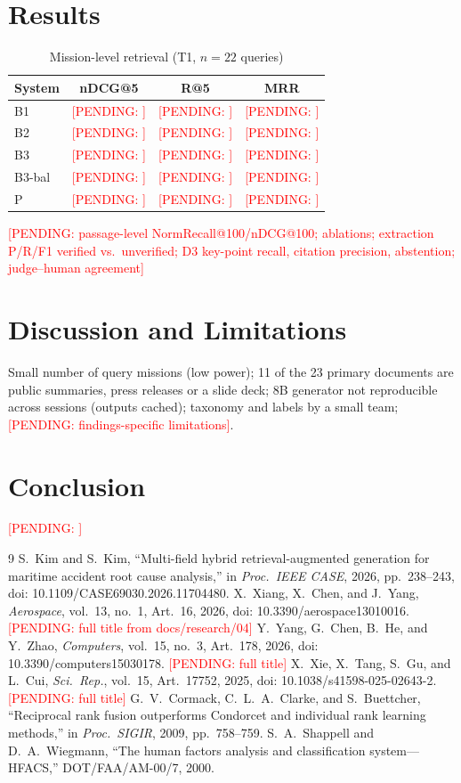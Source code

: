 \documentclass[conference]{IEEEtran}
\newcommand{\PENDING}[1]{\textcolor{red}{[PENDING: #1]}}
\begin{document}
\section{Results}
\begin{table}[t]\centering\caption{Mission-level retrieval (T1, $n=22$ queries)}
\begin{tabular}{lccc}\toprule System & nDCG@5 & R@5 & MRR\\\midrule
B1 & \PENDING{} & \PENDING{} & \PENDING{}\\
B2 & \PENDING{} & \PENDING{} & \PENDING{}\\
B3 & \PENDING{} & \PENDING{} & \PENDING{}\\
B3-bal & \PENDING{} & \PENDING{} & \PENDING{}\\
P & \PENDING{} & \PENDING{} & \PENDING{}\\\bottomrule\end{tabular}\end{table}
\PENDING{passage-level NormRecall@100/nDCG@100; ablations; extraction P/R/F1 verified vs.\ unverified;
D3 key-point recall, citation precision, abstention; judge--human agreement}

\section{Discussion and Limitations}
Small number of query missions (low power); 11 of the 23 primary documents are public summaries, press releases or a slide deck; 8B
generator not reproducible across sessions (outputs cached); taxonomy and labels by a small team;
\PENDING{findings-specific limitations}.

\section{Conclusion}
\PENDING{}

\begin{thebibliography}{9}
 S.~Kim and S.~Kim, ``Multi-field hybrid retrieval-augmented generation for maritime accident root cause analysis,'' in \emph{Proc.\ IEEE CASE}, 2026, pp.~238--243, doi: 10.1109/CASE69030.2026.11704480.
 X.~Xiang, X.~Chen, and J.~Yang, \emph{Aerospace}, vol.~13, no.~1, Art.~16, 2026, doi: 10.3390/aerospace13010016. \PENDING{full title from docs/research/04}
 Y.~Yang, G.~Chen, B.~He, and Y.~Zhao, \emph{Computers}, vol.~15, no.~3, Art.~178, 2026, doi: 10.3390/computers15030178. \PENDING{full title}
 X.~Xie, X.~Tang, S.~Gu, and L.~Cui, \emph{Sci.\ Rep.}, vol.~15, Art.~17752, 2025, doi: 10.1038/s41598-025-02643-2. \PENDING{full title}
 G.~V.~Cormack, C.~L.~A.~Clarke, and S.~Buettcher, ``Reciprocal rank fusion outperforms Condorcet and individual rank learning methods,'' in \emph{Proc.\ SIGIR}, 2009, pp.~758--759.
 S.~A.~Shappell and D.~A.~Wiegmann, ``The human factors analysis and classification system---HFACS,'' DOT/FAA/AM-00/7, 2000.
\end{thebibliography}
\end{document}
